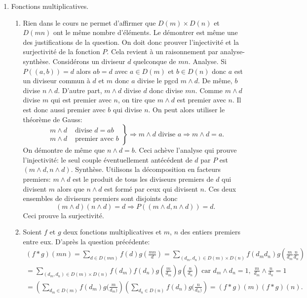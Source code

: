 \begin{enumerate}
\item Fonctions multiplicatives.
\begin{enumerate}
 \item Rien dans le cours ne permet d'affirmer que $D(m)\times D(n)$ et $D(mn)$ ont le même nombre d'éléments. Le démontrer est même une des justifications de la question. On doit donc prouver l'injectivité et la surjectivité de la fonction $P$. Cela revient à un raisonnement par analyse-synthèse.\newline
Considérons un diviseur $d$ quelconque de $mn$.\newline
Analyse.\newline
Si $P((a,b))=d$ alors $ab=d$ avec $a\in D(m)$ et $b\in D(n)$ donc $a$ est un diviseur commun à $d$ et $m$ donc $a$ divise le pgcd $m\wedge d$. De même, $b$ divise $n\wedge d$.\newline
D'autre part, $m\wedge d$ divise $d$ donc divise $mn$. Comme $m\wedge d$ divise $m$ qui est premier avec $n$, on tire que $m\wedge d$ est premier avec $n$. Il est donc aussi premier avec $b$ qui divise $n$. On peut alors utiliser le théorème de Gauss:
\begin{displaymath}
 \left. 
\begin{aligned}
m\wedge d &\text{ divise } d=ab \\ m\wedge d &\text{ premier avec } b
\end{aligned}
 \right\rbrace \Rightarrow m\wedge d \text{ divise } a \Rightarrow m\wedge d = a .
\end{displaymath}
On démontre de même que $n\wedge d = b$. Ceci achève l'analyse qui prouve l'injectivité: le seul couple éventuellement antécédent de $d$ par $P$ est $(m\wedge d, n\wedge d)$.\newline
Synthèse.\newline
Utilisons la décomposition en facteurs premiers: $m\wedge d$ est le produit de tous les diviseurs premiers de $d$ qui divisent $m$ alors que $n\wedge d$ est formé par ceux qui divisent $n$. Ces deux ensembles de diviseurs premiers sont disjoints donc 
\begin{displaymath}
 (m\wedge d)( n\wedge d) = d \Rightarrow P((m\wedge d, n\wedge d))= d.
\end{displaymath}
Ceci prouve la surjectivité.
 \item Soient $f$ et $g$ deux fonctions multiplicatives et $m$, $n$ des entiers premiers entre eux. D'après la question précédente:
\begin{multline*}
 (f*g)(mn) = \sum_{d\in D(mn)}f(d)g(\frac{mn}{d})
= \sum_{(d_m,d_n)\in D(m)\times D(n)}f(d_m d_n)g(\frac{m}{d_m}\frac{n}{d_n}) \\
= \sum_{(d_m,d_n)\in D(m)\times D(n)}f(d_m)f(d_n)g(\frac{m}{d_m})g(\frac{n}{d_n})\text{ car } d_m\wedge d_n = 1,\;\frac{m}{d_m}\wedge\frac{n}{d_n}=1\\
=\left( \sum_{d_m\in D(m)}f(d_m)g(\frac{m}{d_m)}\right)\left( \sum_{d_n\in D(n)}f(d_n)g(\frac{n}{d_n)}\right)
= (f*g)(m) (f*g)(n) .
\end{multline*}


\end{enumerate}
\end{enumerate}
